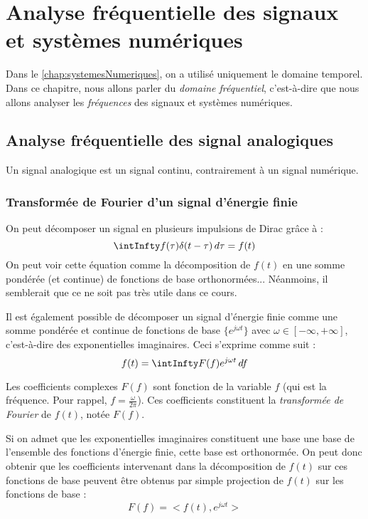 \chapter{Analyse fréquentielle des signaux et systèmes numériques}
    Dans le \autoref{chap:systemesNumeriques}, on a utilisé uniquement le domaine temporel. Dans ce chapitre, nous allons parler du \textit{domaine fréquentiel}, c'est-à-dire que nous allons analyser les \textit{fréquences} des signaux et systèmes numériques.

    \section{Analyse fréquentielle des signal analogiques}
        Un signal analogique est un signal continu, contrairement à un signal numérique.

        \subsection{Transformée de Fourier d'un signal d'énergie finie}
            On peut décomposer un signal en plusieurs impulsions de Dirac grâce à :
            $$ 
                \intInfty f(\tau)\delta(t-\tau)\,d\tau = f(t)
            $$
            On peut voir cette équation comme la décomposition de $f(t)$ en une somme pondérée (et continue) de fonctions de base orthonormées... Néanmoins, il semblerait que ce ne soit pas très utile dans ce cours.

            Il est également possible de décomposer un signal d'énergie finie comme une somme pondérée et continue de fonctions de base $\{e^{j\omega t}\}$ avec $\omega \in [-\infty, +\infty]$, c'est-à-dire des exponentielles imaginaires. Ceci s'exprime comme suit :
            \begin{equation}
                f(t) = \intInfty F(f) e^{j\omega t}\,df
                \label{eq:decompositionExponentielles}
            \end{equation}

            Les coefficients complexes $F(f)$ sont fonction de la variable $f$ (qui est la fréquence. Pour rappel, $f = \frac{\omega}{2\pi}$). Ces coefficients constituent la \textit{transformée de Fourier} de $f(t)$, notée $F(f)$.

            Si on admet que les exponentielles imaginaires constituent une base une base de l'ensemble des fonctions d'énergie finie, cette base est orthonormée. On peut donc obtenir que les coefficients intervenant dans la décomposition de $f(t)$ sur ces fonctions de base peuvent être obtenus par simple projection de $f(t)$ sur les fonctions de base :
            $$
                F(f) = <f(t), e^{j\omega t}>
            $$


